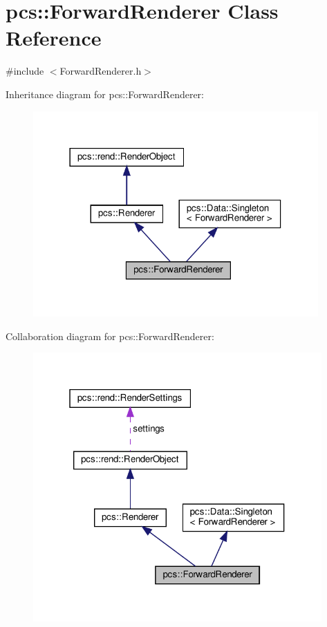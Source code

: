 \hypertarget{classpcs_1_1ForwardRenderer}{}\section{pcs\+:\+:Forward\+Renderer Class Reference}
\label{classpcs_1_1ForwardRenderer}


{\ttfamily \#include $<$Forward\+Renderer.\+h$>$}



Inheritance diagram for pcs\+:\+:Forward\+Renderer\+:\nopagebreak
\begin{figure}[H]
\begin{center}
\leavevmode
\includegraphics[width=309pt]{classpcs_1_1ForwardRenderer__inherit__graph}
\end{center}
\end{figure}


Collaboration diagram for pcs\+:\+:Forward\+Renderer\+:\nopagebreak
\begin{figure}[H]
\begin{center}
\leavevmode
\includegraphics[width=313pt]{classpcs_1_1ForwardRenderer__coll__graph}
\end{center}
\end{figure}
